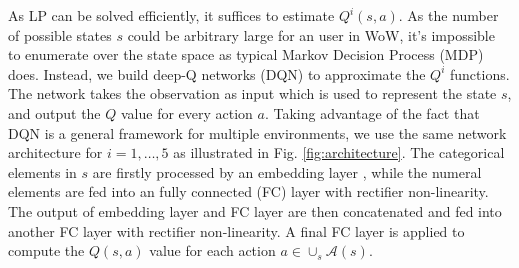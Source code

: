 \documentclass{sigchi}
\begin{document}
As LP can be solved efficiently, it suffices to estimate $Q^i(s,a)$.
As the number of possible states $s$ could be arbitrary large for an user in WoW, it's impossible to enumerate over the state space as typical Markov Decision Process (MDP) does.
Instead, we build deep-Q networks (DQN) \cite{mnih2015human} to approximate the $Q^i$ functions.
The network takes the observation as input which is used to represent the state $s$, and output the $Q$ value for every action $a$.
Taking advantage of the fact that DQN is a general framework for multiple environments, we use the same network architecture for $i=1,\dots,5$ as illustrated in Fig. \ref{fig:architecture}. 
The categorical elements in $s$ are firstly processed by an embedding layer \cite{mikolov2013distributed}, while the numeral elements are fed into an fully connected (FC) layer with rectifier non-linearity. 
The output of embedding layer and FC layer are then concatenated and fed into another FC layer with rectifier non-linearity. 
A final FC layer is applied to compute the $Q(s,a)$ value for each action $a\in\cup_s\mathcal{A}(s)$.
\end{document}

